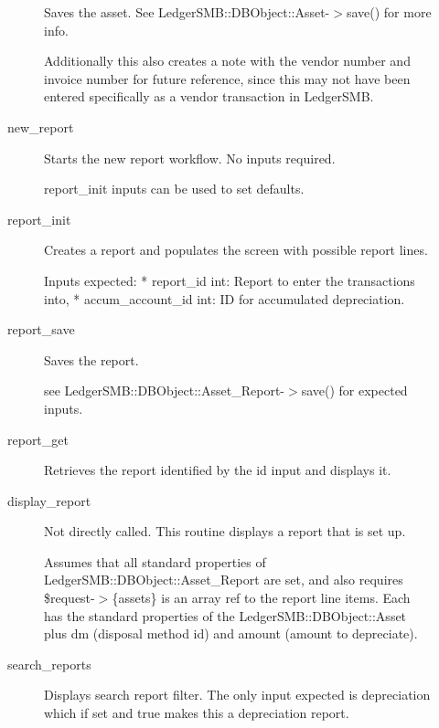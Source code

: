 \begin{description}
\begin{description}
Saves the asset.  See LedgerSMB::DBObject::Asset-$>$save() for more info.



Additionally this also creates a note with the vendor number and invoice number
for future reference, since this may not have been entered specifically as a
vendor transaction in LedgerSMB.


\item[{new\_report}] \mbox{}

Starts the new report workflow.  No inputs required.



report\_init inputs can be used to set defaults.


\item[{report\_init}] \mbox{}

Creates a report and populates the screen with possible report lines.



Inputs expected:
* report\_id int:  Report to enter the transactions into, 
* accum\_account\_id int:  ID for accumulated depreciation.


\item[{report\_save}] \mbox{}

Saves the report.



see LedgerSMB::DBObject::Asset\_Report-$>$save() for expected inputs.


\item[{report\_get}] \mbox{}

Retrieves the report identified by the id input and displays it.


\item[{display\_report}] \mbox{}

Not directly called.  This routine displays a report that is set up.



Assumes that all standard properties of LedgerSMB::DBObject::Asset\_Report are 
set, and also requires \$request-$>$\{assets\} is an array ref to the report line
items.  Each has the standard properties of the LedgerSMB::DBObject::Asset plus
dm (disposal method id) and amount (amount to depreciate).


\item[{search\_reports}] \mbox{}

Displays search report filter.  The only input expected is depreciation which if
set and true makes this a depreciation report.




\end{description}
\end{description}
